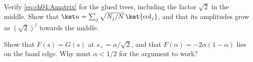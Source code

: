 \documentclass[handoutsbeamer.tex]{subfiles}
\begin{document}
\begin{frame}
\begin{exe}[Columns]
Verify \eqref{eq:ch04:Amatrix} for the glued trees, including the factor $\sqrt2$ in the middle. Show that $\ket u = \sum_j\sqrt{N_j/N}\,\ket{{\rm col}_j}$, and that its amplitudes grow as $(\sqrt2)^j$ towards the middle.
\end{exe}
\begin{exe}
Show that $F(s) = G(s)$ at $s_\times = \alpha/\sqrt2$, and that $F(\alpha) = -2\alpha(1-\alpha)$ lies on the band edge. Why must $\alpha < 1/2$ for the argument to work?
\end{exe}
\end{frame}

\begin{frame}[allowframebreaks]
\biblio
\end{frame}
\end{document}

